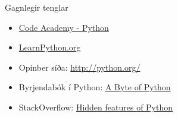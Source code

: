 \documentclass[handout]{beamer}
\begin{document}
\begin{frame}{Gagnlegir tenglar}
\begin{itemize}
 \item \href{http://www.codecademy.com/en/tracks/python}{Code Academy - Python}
 \item \href{http://www.learnpython.org/}{LearnPython.org}
 \item Opinber síða: \url{http://python.org/}
 \item Byrjendabók í Python: \href{http://www.swaroopch.com/notes/python/}{A Byte of Python}
 \item StackOverflow: \href{http://stackoverflow.com/questions/101268/hidden-features-of-python}{Hidden features of Python}
\end{itemize}
\end{frame}
\end{document}
